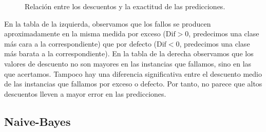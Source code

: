 \documentclass{article}
\begin{document}
\begin{figure}[H]
  \centering {}
  \caption{Relación entre los descuentos y la exactitud de las predicciones.}
  \label{fig:descuento}
\end{figure}

En la tabla de la izquierda, observamos que los fallos se producen
aproximadamente en la misma medida por exceso ($\text{Dif}>0$,
predecimos una clase más cara a la correspondiente) que por defecto
($\text{Dif}<0$, predecimos una clase más barata a la
correspondiente). En la tabla de la derecha observamos que los valores
de descuento no son mayores en las instancias que fallamos, sino en
las que acertamos. Tampoco hay una diferencia significativa entre el
descuento medio de las instancias que fallamos por exceso o
defecto. Por tanto, no parece que altos descuentos lleven a mayor
error en las predicciones.

\pagebreak

\subsection{Naive-Bayes}
\end{document}
